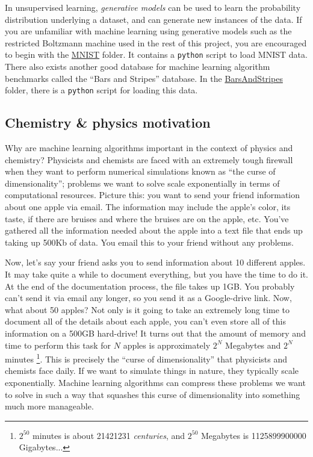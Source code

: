 \documentclass[12pt]{article}
\begin{document}
In unsupervised learning, {\it generative models} can be used to learn the probability distribution underlying a dataset, and can generate new instances of the data.
If you are unfamiliar with machine learning using generative models such as the restricted Boltzmann machine used in the rest of this project, 
you are encouraged to begin with the 
\href{https://github.com/CDL-Quantum/CohortProject_2020/tree/master/Project_1_RBM_and_Tomography/MNIST}{MNIST} folder. 
It contains a \texttt{python} script to load MNIST data. There also exists another good database for machine learning algorithm benchmarks called the ``Bars and Stripes'' database. In the \href{https://github.com/CDL-Quantum/CohortProject_2020/tree/master/Project_1_RBM_and_Tomography/BarsAndStripes}{BarsAndStripes} folder, there is a \texttt{python} script for loading this data.  

\subsection*{Chemistry \& physics motivation}

Why are machine learning algorithms important in the context of physics and chemistry? Physicists and chemists are faced with an extremely tough firewall when they want to perform numerical simulations known as ``the curse of dimensionality''; problems we want to solve scale exponentially in terms of computational resources. Picture this: you want to send your friend information about one apple via email. The information may include the apple's color, its taste, if there are bruises and where the bruises are on the apple, etc. You've gathered all the information needed about the apple into a text file that ends up taking up 500Kb of data. You email this to your friend without any problems. 

Now, let's say your friend asks you to send information about 10 different apples. It may take quite a while to document everything, but you have the time to do it. At the end of the documentation process, the file takes up 1GB. You probably can't send it via email any longer, so you send it as a Google-drive link. Now, what about 50 apples? Not only is it going to take an extremely long time to document all of the details about each apple, you can't even store all of this information on a 500GB hard-drive! It turns out that the amount of memory and time to perform this task for $N$ apples is approximately $2^N$ Megabytes and $2^N$ minutes \footnote{$2^{50}$ minutes is about 21421231 \textit{centuries}, and $2^{50}$ Megabytes is 1125899900000 Gigabytes...}.
This is precisely the ``curse of dimensionality'' that physicists and chemists face daily. If we want to simulate things in nature, they typically scale exponentially. Machine learning algorithms can compress these problems we want to solve in such a way that squashes this curse of dimensionality into something much more manageable.
\end{document}
